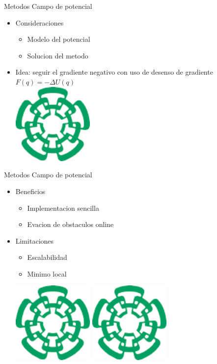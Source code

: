 \documentclass[
	11pt, %
]{beamer}
\begin{document}
\begin{frame}{Metodos Campo de potencial}
  \begin{itemize}
  \item Consideraciones\\
    \begin{itemize}
    \item Modelo del potencial
    \item Solucion del metodo
    \end{itemize}
  \item Idea: seguir el gradiente negativo con uso de desenso de gradiente\\
    \centering
    $F(q)=-\Delta U(q)$\\
    \includegraphics[angle=45,width=4cm]{cinvestavlogo}
  \end{itemize}
\end{frame}

\begin{frame}{Metodos Campo de potencial}
  \begin{itemize}
  \item Beneficios\\
    \begin{itemize}
    \item Implementacion sencilla
    \item Evacion de obstaculos online
    \end{itemize}
  \item Limitaciones\\
    \begin{itemize}
    \item Escalabilidad
    \item Minimo local
    \end{itemize}
    \centering
    \includegraphics[angle=45,width=4cm]{cinvestavlogo}
    \includegraphics[angle=45,width=4cm]{cinvestavlogo}
  \end{itemize}
\end{frame}
\end{document}
